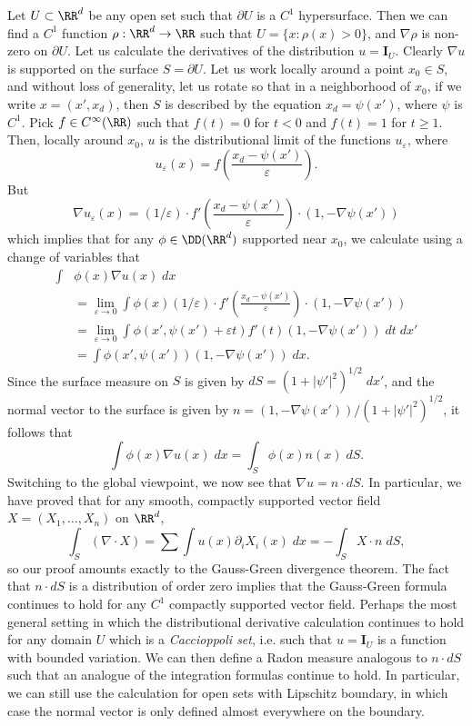 \begin{example}
    Let $U \subset \RR^d$ be any open set such that $\partial U$ is a $C^1$ hypersurface. Then we can find a $C^1$ function $\rho: \RR^d \to \RR$ such that $U = \{ x : \rho(x) > 0 \}$, and $\nabla \rho$ is non-zero on $\partial U$. Let us calculate the derivatives of the distribution $u = \mathbf{I}_U$. Clearly $\nabla u$ is supported on the surface $S = \partial U$. Let us work locally around a point $x_0 \in S$, and without loss of generality, let us rotate so that in a neighborhood of $x_0$, if we write $x = (x',x_d)$, then $S$ is described by the equation $x_d = \psi(x')$, where $\psi$ is $C^1$. Pick $f \in C^\infty(\RR)$ such that $f(t) = 0$ for $t < 0$ and $f(t) = 1$ for $t \geq 1$. Then, locally around $x_0$, $u$ is the distributional limit of the functions $u_\varepsilon$, where
    \[ u_\varepsilon(x) = f \left( \frac{x_d - \psi(x')}{\varepsilon} \right). \]
    But
    \[ \nabla u_\varepsilon(x) = (1/\varepsilon) \cdot f' \left( \frac{x_d - \psi(x')}{\varepsilon} \right) \cdot \left( 1, - \nabla \psi(x') \right) \]
    which implies that for any $\phi \in \DD(\RR^d)$ supported near $x_0$, we calculate using a change of variables that
    \begin{align*}
        \int &\phi(x) \nabla u(x)\; dx\\
        &= \lim_{\varepsilon \to 0} \int \phi(x) (1/\varepsilon) \cdot f' \left( \frac{x_d - \psi(x')}{\varepsilon} \right) \cdot \left( 1, - \nabla \psi(x') \right)\\
        &= \lim_{\varepsilon \to 0} \int \phi(x', \psi(x') + \varepsilon t) f'(t) (1, -\nabla \psi(x'))\; dt\; dx'\\
        &= \int \phi(x', \psi(x')) (1, -\nabla \psi(x'))\; dx.
    \end{align*}
    Since the surface measure on $S$ is given by $dS = (1 + |\psi'|^2)^{1/2}\; dx'$, and the normal vector to the surface is given by $n = (1, -\nabla \psi(x')) / (1 + |\psi'|^2)^{1/2}$, it follows that
    \[ \int \phi(x) \nabla u(x)\; dx = \int_S \phi(x) n(x)\; dS. \]
    Switching to the global viewpoint, we now see that $\nabla u = n \cdot dS$. In particular, we have proved that for any smooth, compactly supported vector field $X = (X_1,\dots,X_n)$ on $\RR^d$,
    \[ \int_S (\nabla \cdot X) = \sum \int u(x) \partial_i X_i(x)\; dx = - \int_S X \cdot n\; dS, \]
    so our proof amounts exactly to the Gauss-Green divergence theorem. The fact that $n \cdot dS$ is a distribution of order zero implies that the Gauss-Green formula continues to hold for any $C^1$ compactly supported vector field. Perhaps the most general setting in which the distributional derivative calculation continues to hold for any domain $U$ which is a \emph{Caccioppoli set}, i.e. such that $u = \mathbf{I}_U$ is a function with bounded variation. We can then define a Radon measure analogous to $n \cdot dS$ such that an analogue of the integration formulas continue to hold. In particular, we can still use the calculation for open sets with Lipschitz boundary, in which case the normal vector is only defined almost everywhere on the boundary.    
\end{example}

